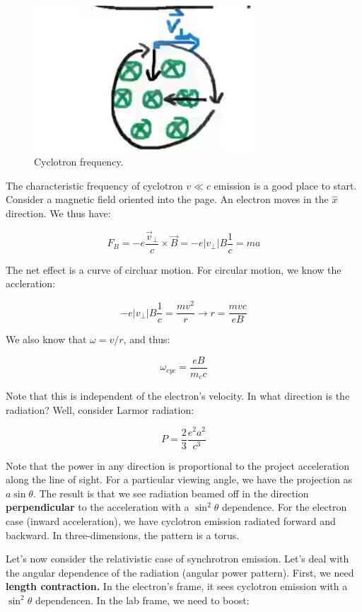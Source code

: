 \documentclass{article}
\def\Bfield{{\vec{B}}}
\begin{document}
\begin{figure}
    \centering
    \includegraphics[width = 0.75\textwidth]{Screen Shot 2020-11-02 at 2.53.09 PM.png}
    \caption{Cyclotron frequency.}
    \label{fig:cycfreq}
\end{figure}

The characteristic frequency of cyclotron $v \ll c$ emission is a good place to start. Consider a magnetic field oriented into the page. An electron moves in the $\hat x$ direction. We thus have:

$$
F_B = -e \frac{\vec v_\perp}{c}\times \Bfield = -e |v_\perp|B\frac{1}{c} = ma
$$

The net effect is a curve of circluar motion. For circular motion, we know the accleration:

$$
-e |v_\perp|B\frac{1}{c} = \frac{mv^2}{r} \rightarrow r = \frac{mvc}{eB}
$$

We also know that $\omega = v/r$, and thus:

$$
\boxed{\omega_{cyc} = \frac{eB}{m_e c}}
$$

Note that this is independent of the electron's velocity. In what direction is the radiation? Well, consider Larmor radiation:

$$
P = \frac23 \frac{e^2 a^2}{c^3}
$$

Note that the power in any direction is proportional to the project acceleration along the line of sight. For a particular viewing angle, we have the projection as $a \sin\theta$. The result is that we see radiation beamed off in the direction \textbf{perpendicular} to the acceleration with a $\sin^2\theta$ dependence. For the electron case (inward acceleration), we have cyclotron emission radiated forward and backward. In three-dimensions, the pattern is a torus. 

Let's now consider the relativistic case of synchrotron emission. Let's deal with the angular dependence of the radiation (angular power pattern). First, we need \textbf{length contraction.} In the electron's frame, it sees cyclotron emission with a $\sin^2\theta$ dependencen. In the lab frame, we need to boost:
\end{document}
